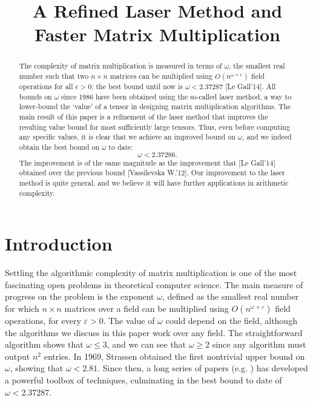 \documentclass{theoretics}
\title{A Refined Laser Method and Faster Matrix Multiplication}
\newcommand{\eps}{\varepsilon}
\begin{document}
\maketitle


\begin{abstract}
The complexity of matrix multiplication is measured in terms of $\omega$, the smallest real number such that two $n\times n$ matrices can be multiplied using $O(n^{\omega+\epsilon})$ field operations for all $\epsilon>0$; the best bound until now is $\omega<2.37287$ [Le Gall'14]. All bounds on $\omega$ since 1986 have been obtained using the so-called laser method, a way to lower-bound the `value' of a tensor in designing matrix multiplication algorithms. The main result of this paper is a refinement of the laser method that improves the resulting value bound for most sufficiently large tensors. Thus, even before computing any specific values, it is clear that we achieve an improved bound on $\omega$, and we indeed obtain the best bound on $\omega$ to date:
$$\omega < 2.37286.$$
The improvement is of the same magnitude as the improvement that [Le Gall'14] obtained over the previous bound [Vassilevska W.'12]. Our improvement to the laser method is quite general, and we believe it will have further applications in arithmetic complexity.
\end{abstract}

 

\section{Introduction}
Settling the algorithmic complexity of matrix multiplication is one of the most fascinating open problems in theoretical computer science. The main measure of progress on the problem is the exponent $\omega$, defined as the smallest real number for which $n\times n$ matrices over a field can be multiplied using $O(n^{\omega+\eps})$ field operations, for every $\eps>0$. The value of $\omega$ could depend on the field, although the algorithms we discuss in this paper work over any field.
The straightforward algorithm shows that $\omega\leq 3$, and we can see that $\omega\geq 2$ since any algorithm must output $n^2$ entries. In 1969, Strassen \cite{strassen} obtained the first nontrivial upper bound on $\omega$, showing that $\omega<2.81$. Since then, a long series of papers (e.g. \cite{Pan78,BCRL79,Pan80,Sch81,Romani82,cw81as,laser,coppersmith,stothers,v12,legall,cohn2003group,cohn2005group,cohn2013fast}) has developed a powerful toolbox of techniques, culminating in the best bound to date of $\omega<2.37287$.
\end{document}
